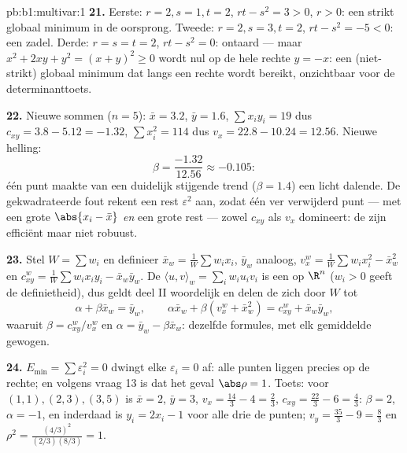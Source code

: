 \begin{solution}{pb:b1:multivar:1}
\textbf{21.} Eerste: $r = 2, s = 1, t = 2$, $rt - s^2 = 3 > 0$, $r
> 0$: een strikt globaal minimum in de oorsprong. Tweede: $r = 2, s
= 3, t = 2$, $rt - s^2 = -5 < 0$: een zadel. Derde: $r = s = t =
2$, $rt - s^2 = 0$: ontaard --- maar $x^2 + 2xy + y^2 = (x + y)^2
\geq 0$ wordt nul op de hele rechte $y = -x$: een (niet-strikt)
globaal minimum dat langs een rechte wordt bereikt, onzichtbaar
voor de determinanttoets.

\textbf{22.} Nieuwe sommen ($n = 5$): $\bar x = 3.2$, $\bar y =
1.6$, $\sum x_iy_i = 19$ dus $c_{xy} = 3.8 - 5.12 = -1.32$, $\sum
x_i^2 = 114$ dus $v_x = 22.8 - 10.24 = 12.56$. Nieuwe helling:
\[
\beta = \frac{-1.32}{12.56} \approx -0.105 :
\]
één punt maakte van een duidelijk stijgende trend ($\beta = 1.4$)
een licht dalende. De gekwadrateerde fout rekent een rest
$\varepsilon^2$ aan, zodat één ver verwijderd punt --- met een
grote $\abs{x_{i} - \bar x}$ \emph{en} een grote rest --- zowel
$c_{xy}$ als $v_x$ domineert: de  zijn efficiënt
maar niet robuust.

\textbf{23.} Stel $W = \sum w_i$ en definieer $\bar x_w =
\frac1W\sum w_ix_i$, $\bar y_w$ analoog, $v_x^w = \frac1W\sum
w_ix_i^2 - \bar x_w^2$ en $c^w_{xy} = \frac1W\sum w_ix_iy_i - \bar
x_w\bar y_w$. De  $\langle u, v\rangle_w = \sum_i
w_iu_iv_i$ is een  op $\R^n$ ($w_i > 0$ geeft de
definietheid), dus geldt deel II woordelijk en delen de
 zich door $W$ tot
\[
\alpha + \beta\bar x_w = \bar y_w,
\qquad
\alpha\bar x_w + \beta(v^w_x + \bar x_w^2) = c^w_{xy} + \bar
x_w\bar y_w ,
\]
waaruit $\beta = c^w_{xy}/v^w_x$ en $\alpha = \bar y_w -
\beta\bar x_w$: dezelfde formules, met elk gemiddelde gewogen.

\textbf{24.} $E_{\min} = \sum\varepsilon_i^2 = 0$ dwingt elke
$\varepsilon_i = 0$ af: alle punten liggen precies op de rechte; en
volgens vraag 13 is dat het geval $\abs\rho = 1$. Toets: voor
$(1,1), (2,3), (3,5)$ is $\bar x = 2$, $\bar y = 3$, $v_x =
\frac{14}3 - 4 = \frac23$, $c_{xy} = \frac{22}3 - 6 = \frac43$:
$\beta = 2$, $\alpha = -1$, en inderdaad is $y_i = 2x_i - 1$ voor
alle drie de punten; $v_y = \frac{35}3 - 9 = \frac83$ en $\rho^2 =
\frac{(4/3)^2}{(2/3)(8/3)} = 1$.


\end{solution}
